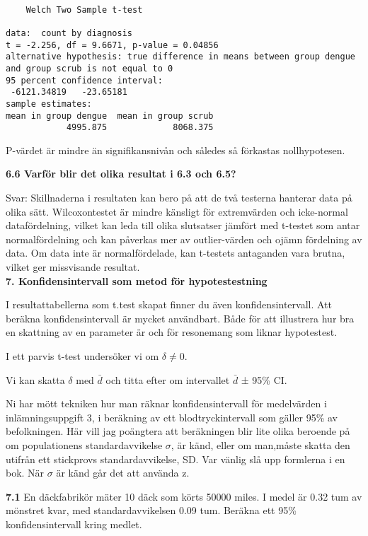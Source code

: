 \documentclass[
  letterpaper,
  DIV=11,
  numbers=noendperiod]{scrartcl}
\begin{document}
\begin{verbatim}

    Welch Two Sample t-test

data:  count by diagnosis
t = -2.256, df = 9.6671, p-value = 0.04856
alternative hypothesis: true difference in means between group dengue and group scrub is not equal to 0
95 percent confidence interval:
 -6121.34819   -23.65181
sample estimates:
mean in group dengue  mean in group scrub 
            4995.875             8068.375 
\end{verbatim}

P-värdet är mindre än signifikansnivån och således så förkastas
nollhypotesen.

\textbf{6.6 Varför blir det olika resultat i 6.3 och 6.5?}

\hfill\break
Svar: Skillnaderna i resultaten kan bero på att de två testerna hanterar
data på olika sätt. Wilcoxontestet är mindre känsligt för extremvärden
och icke-normal datafördelning, vilket kan leda till olika slutsatser
jämfört med t-testet som antar normalfördelning och kan påverkas mer av
outlier-värden och ojämn fördelning av data. Om data inte är
normalfördelade, kan t-testets antaganden vara brutna, vilket ger
missvisande resultat.\\

\textbf{7. Konfidensintervall som metod för hypotestestning}

I resultattabellerna som t.test skapat finner du även
konfidensintervall. Att beräkna konfidensintervall är mycket användbart.
Både för att illustrera hur bra en skattning av en parameter är och för
resonemang som liknar hypotestest.

I ett parvis t-test undersöker vi om \(δ ≠ 0\).

Vi kan skatta \(δ\) med \(\bar{d}\) och titta efter om intervallet
\(\bar{d}\) ± 95\% CI.

Ni har mött tekniken hur man räknar konfidensintervall för medelvärden i
inlämningsuppgift 3, i beräkning av ett blodtryckintervall som gäller
95\% av befolkningen. Här vill jag poängtera att beräkningen blir lite
olika beroende på om populationens standardavvikelse \(σ\), är känd,
eller om man,måste skatta den utifrån ett stickprovs standardavvikelse,
SD. Var vänlig slå upp formlerna i en bok. När \(σ\) är känd går det att
använda z.

\textbf{7.1} En däckfabrikör mäter 10 däck som körts 50000 miles. I
medel är 0.32 tum av mönstret kvar, med standardavvikelsen 0.09 tum.
Beräkna ett 95\% konfidensintervall kring medlet.
\end{document}
